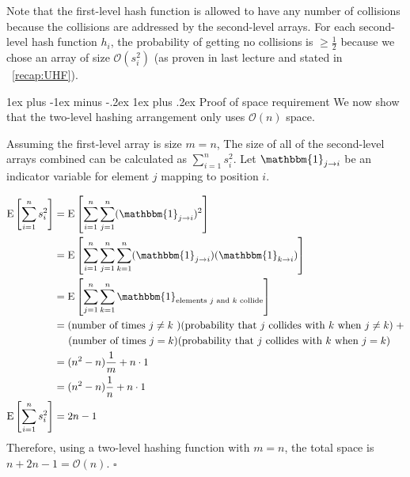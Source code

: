 \documentclass[11pt]{article}
\makeatletter
\renewcommand{\subsection}{\@startsection{subsection}{2}{0mm}%
                                   {1ex plus -1ex minus -.2ex}%
                                   {1ex plus .2ex}%
                                   {\normalfont\large\bfseries}}%
\newcommand{\expc}{{\bf {\rm E}}}
\newcommand*{\QEDB}{\null\nobreak\hfill\ensuremath{\square}}
\newcommand{\bigo}{\mathcal{O}}
\makeatother
\begin{document}
Note that the first-level hash function is allowed to have any number of collisions because the collisions are addressed by the second-level arrays. For each second-level hash function $h_i$, the probability of getting no collisions is $\geq \frac{1}{2}$ because we chose an array of size $\bigo(s_i^2)$ (as proven in last lecture and stated in ~\ref{recap:UHF}).

\subsection{Proof of space requirement}
We now show that the two-level hashing arrangement only uses $\bigo(n)$ space.

Assuming the first-level array is size $m = n$, The size of all of the second-level arrays combined can be calculated as $\sum_{i=1}^{n}s_i^2$. Let $\mathbbm{1}_{j \rightarrow i}$ be an indicator variable for element $j$ mapping to position $i$.

\begin{align*}
\expc\left[\sum_{i=1}^{n}s_i^2\right] &= \expc\left[\sum_{i=1}^{n} \sum_{j=1}^{n} (\mathbbm{1}_{j \rightarrow i})^2\right] \\
&= \expc\left[\sum_{i=1}^{n} \sum_{j=1}^{n} \sum_{k=1}^{n} (\mathbbm{1}_{j \rightarrow i})(\mathbbm{1}_{k \rightarrow i})\right] \\
&= \expc\left[\sum_{j=1}^{n} \sum_{k=1}^{n} \mathbbm{1}_{\text{elements $j$ and $k$ collide}}\right] \\
&= (\text{number of times $j \neq k$ })(\text{probability that $j$ collides with $k$ when $j \neq k$}) \; + \\
& \; \; \; \; \;(\text{number of times $j = k$})(\text{probability that $j$ collides with $k$ when $j = k$}) \\
&= (n^2 - n)\frac{1}{m} + n \cdot 1 \\
&= (n^2 - n)\frac{1}{n} + n \cdot 1 \\
\expc\left[\sum_{i=1}^{n}s_i^2\right] &= 2n - 1
\end{align*}
Therefore, using a two-level hashing function with $m=n$, the total space is $n + 2n - 1 = \bigo(n)$.
\QEDB
\end{document}
